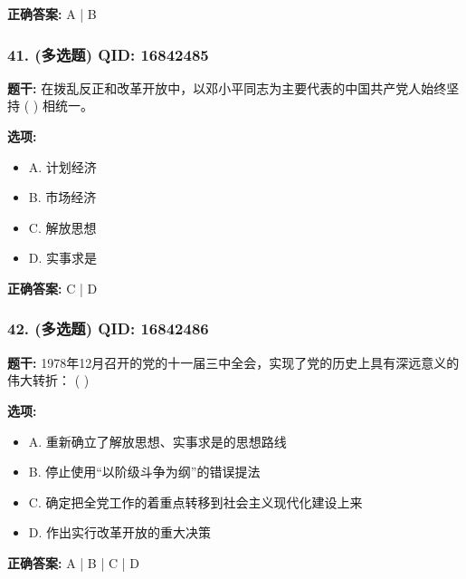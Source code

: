 \documentclass[12pt,UTF8]{ctexart}
\begin{document}
\textbf{正确答案:}
A | B

\vspace{0.3em}\hrulefill\vspace{0.7em}

\subsubsection*{41. (多选题) \small QID: 16842485}

\textbf{题干:}
在拨乱反正和改革开放中，以邓小平同志为主要代表的中国共产党人始终坚持 ( ) 相统一。

\textbf{选项:}
\begin{itemize}[leftmargin=*]

  \item A. 计划经济

  \item B. 市场经济

  \item C. 解放思想

  \item D. 实事求是

\end{itemize}

\textbf{正确答案:}
C | D

\vspace{0.3em}\hrulefill\vspace{0.7em}

\subsubsection*{42. (多选题) \small QID: 16842486}

\textbf{题干:}
1978年12月召开的党的十一届三中全会，实现了党的历史上具有深远意义的伟大转折： ( )

\textbf{选项:}
\begin{itemize}[leftmargin=*]

  \item A. 重新确立了解放思想、实事求是的思想路线

  \item B. 停止使用“以阶级斗争为纲”的错误提法

  \item C. 确定把全党工作的着重点转移到社会主义现代化建设上来

  \item D. 作出实行改革开放的重大决策

\end{itemize}

\textbf{正确答案:}
A | B | C | D
\end{document}
